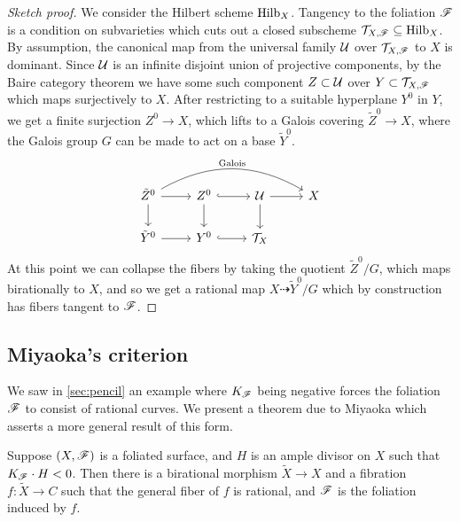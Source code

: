 \begin{proof}[Sketch proof]
    We consider the Hilbert scheme $\operatorname{Hilb}_X$. Tangency to the foliation $\mathscr{F}$
    is a condition on subvarieties which cuts out a closed subscheme
    $\mathcal{T}_{X,\mathscr{F}}\subseteq\operatorname{Hilb}_X$. By assumption, the canonical map from the
    universal family $\mathcal{U}$ over $\mathcal{T}_{X,\mathscr{F}}$ to $X$ is dominant. Since
    $\mathcal{U}$ is an infinite disjoint union of projective components, by the Baire
    category theorem we have some such component $Z\subset\mathcal{U}$ over
    $Y\subset\mathcal{T}_{X,\mathscr{F}}$ which maps surjectively to $X$. After restricting
    to a suitable hyperplane $Y^0$ in $Y$, we get a finite surjection
    $Z^0\to X$, which lifts to a Galois covering $\tilde Z^0\to X$, where the
    Galois group $G$ can be made to act on a base $\tilde Y^0$.
    \begin{equation*}
        \begin{tikzcd}
            \tilde Z^0 \ar[d] \ar[r]
                \ar[rrr,bend left,"\text{Galois}"] &
            Z^0 \ar[d] \ar[r,hook] &
            \calU \ar[d] \ar[r] & X \\
            \tilde Y^0 \ar[r] & Y^0 \ar[r,hook] & \calT_X
        \end{tikzcd}
    \end{equation*}
    At this point we can collapse the fibers by taking the quotient
    $\tilde Z^0/G$, which maps birationally to $X$, and so we get a rational map
    $X\dashrightarrow \tilde Y^0/G$ which by construction has fibers tangent to
    $\mathscr{F}$.
\end{proof}


\subsection{Miyaoka's criterion}

We saw in \cref{sec:pencil} an example where $K_{\mathscr{F}}$ being negative forces the
foliation $\mathscr{F}$ to consist of rational curves. We present a theorem due to
Miyaoka which asserts a more general result of this form.


\begin{theorem}[Miyaoka]
    Suppose $(X,\mathscr{F})$ is a foliated surface, and $H$ is an ample divisor on
    $X$ such that $K_{\mathscr{F}}\cdot H<0$. Then there is a birational morphism
    $\tilde X\to X$ and a fibration $f:\tilde X\to C$ such that the general
    fiber of $f$ is rational, and $\mathscr{F}$ is the foliation induced by $f$.
\end{theorem}


